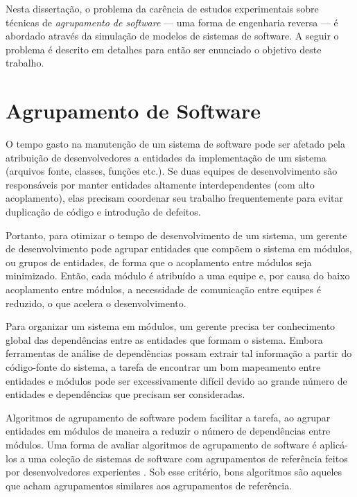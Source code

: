 Nesta dissertação, o problema da carência de estudos experimentais sobre técnicas de \emph{agrupamento de software} --- uma forma de engenharia reversa --- é abordado através da simulação de modelos de sistemas de software. A seguir o problema é descrito em detalhes para então ser enunciado o objetivo deste trabalho.

\section{Agrupamento de Software}


O tempo gasto na manutenção de um sistema de software pode ser afetado pela atribuição de desenvolvedores a entidades da implementação de um sistema (arquivos fonte, classes, funções etc.). Se duas equipes de desenvolvimento são responsáveis por manter entidades altamente interdependentes (com alto acoplamento), elas precisam coordenar seu trabalho frequentemente para evitar duplicação de código e introdução de defeitos.

Portanto, para otimizar o tempo de desenvolvimento de um sistema, um gerente de desenvolvimento pode agrupar entidades que compõem o sistema em módulos, ou grupos de entidades, de forma que o acoplamento entre módulos seja minimizado. Então, cada módulo é atribuído a uma equipe e, por causa do baixo acoplamento entre módulos, a necessidade de comunicação entre equipes é reduzido, o que acelera o desenvolvimento.

Para organizar um sistema em módulos, um gerente precisa ter conhecimento global das dependências entre as entidades que formam o sistema. Embora ferramentas de análise de dependências possam extrair tal informação a partir do código-fonte do sistema, a tarefa de encontrar um bom mapeamento entre entidades e módulos pode ser excessivamente difícil devido ao grande número de entidades e dependências que precisam ser consideradas.

Algoritmos de agrupamento de software podem facilitar a tarefa, ao agrupar entidades em módulos de maneira a reduzir o número de dependências entre módulos. Uma forma de avaliar algoritmos de agrupamento de software é aplicá-los a uma coleção de sistemas de software com agrupamentos de referência feitos por desenvolvedores experientes \cite{Anquetil1999}. Sob esse critério, bons algoritmos são aqueles que acham agrupamentos similares aos agrupamentos de referência.

